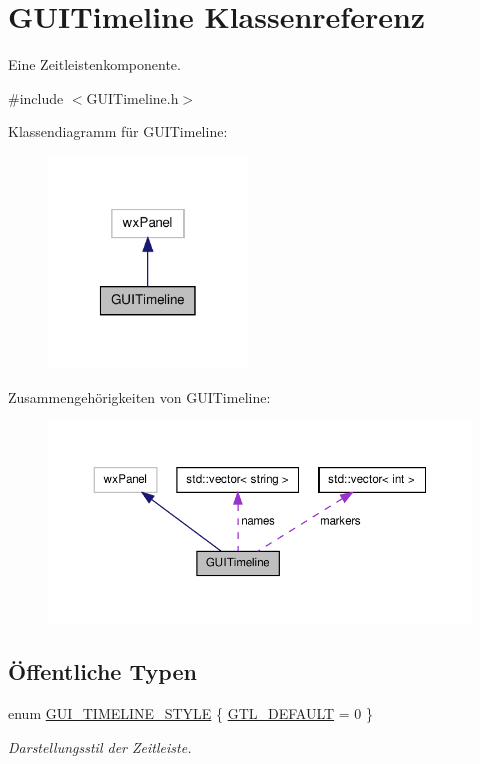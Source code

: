 \hypertarget{classGUITimeline}{\section{G\-U\-I\-Timeline Klassenreferenz}
\label{classGUITimeline}
}


Eine Zeitleistenkomponente.  




{\ttfamily \#include $<$G\-U\-I\-Timeline.\-h$>$}



Klassendiagramm für G\-U\-I\-Timeline\-:\nopagebreak
\begin{figure}[H]
\begin{center}
\leavevmode
\includegraphics[width=150pt]{classGUITimeline__inherit__graph}
\end{center}
\end{figure}


Zusammengehörigkeiten von G\-U\-I\-Timeline\-:
\nopagebreak
\begin{figure}[H]
\begin{center}
\leavevmode
\includegraphics[width=350pt]{classGUITimeline__coll__graph}
\end{center}
\end{figure}
\subsection*{Öffentliche Typen}
\begin{DoxyCompactItemize}
\item 
enum \hyperlink{classGUITimeline_a56f1cf170a8c077a0b94d19a0eba8c94}{G\-U\-I\-\_\-\-T\-I\-M\-E\-L\-I\-N\-E\-\_\-\-S\-T\-Y\-L\-E} \{ \hyperlink{classGUITimeline_a56f1cf170a8c077a0b94d19a0eba8c94a9c676c8ba0c3c3312938d34a8e855bb1}{G\-T\-L\-\_\-\-D\-E\-F\-A\-U\-L\-T} = 0
 \}
\begin{DoxyCompactList}\small\item\em Darstellungsstil der Zeitleiste. \end{DoxyCompactList}\end{DoxyCompactItemize}

